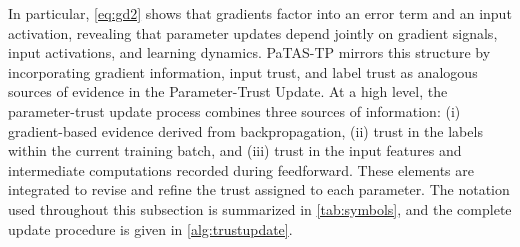 In particular, \cref{eq:gd2} shows that gradients factor into an error term and an input activation, revealing that parameter updates depend jointly on gradient signals, input activations, and learning dynamics. \ac{PaTAS-TP} mirrors this structure by incorporating gradient information, input trust, and label trust as analogous sources of evidence in the Parameter-Trust Update. At a high level, the parameter-trust update process combines three sources of information: (i) gradient-based evidence derived from backpropagation, (ii) trust in the labels within the current training batch, and (iii) trust in the input features and intermediate computations recorded during feedforward. These elements are integrated to revise and refine the trust assigned to each parameter. The notation used throughout this subsection is summarized in \cref{tab:symbols}, and the complete update procedure is given in \cref{alg:trustupdate}.

